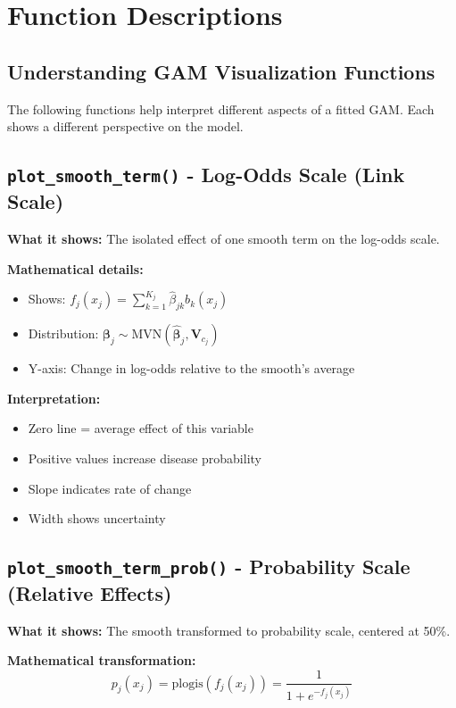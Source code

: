 \documentclass[12pt]{article}
\begin{document}
\section{Function Descriptions}

\subsection{Understanding GAM Visualization Functions}

The following functions help interpret different aspects of a fitted GAM. Each shows a different perspective on the model.

\subsection*{\texttt{plot\_smooth\_term()} - Log-Odds Scale (Link Scale)}

\textbf{What it shows:} The isolated effect of one smooth term on the log-odds scale.

\textbf{Mathematical details:}
\begin{itemize}
   \item Shows: $f_j(x_j) = \sum_{k=1}^{K_j} \hat{\beta}_{jk} b_k(x_j)$
   \item Distribution: $\boldsymbol{\beta}_j \sim \text{MVN}(\hat{\boldsymbol{\beta}}_j, \mathbf{V}_{c_j})$
   \item Y-axis: Change in log-odds relative to the smooth's average
\end{itemize}

\textbf{Interpretation:}
\begin{itemize}
   \item Zero line = average effect of this variable
   \item Positive values increase disease probability
   \item Slope indicates rate of change
   \item Width shows uncertainty
\end{itemize}

\subsection*{\texttt{plot\_smooth\_term\_prob()} - Probability Scale (Relative Effects)}

\textbf{What it shows:} The smooth transformed to probability scale, centered at 50\%.

\textbf{Mathematical transformation:}
$$p_j(x_j) = \text{plogis}(f_j(x_j)) = \frac{1}{1 + e^{-f_j(x_j)}}$$
\end{document}
